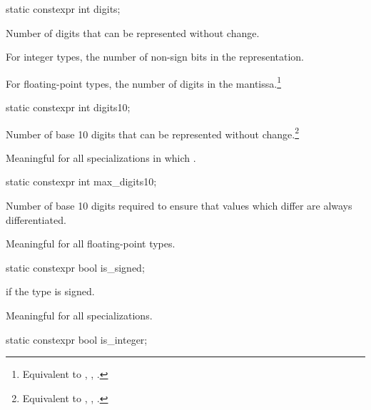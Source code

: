%
\begin{itemdecl}
static constexpr int digits;
\end{itemdecl}

\begin{itemdescr}
\pnum
Number of
digits that can be represented without change.

\pnum
For integer types, the number of non-sign bits in the representation.

\pnum For floating-point types, the number of  digits in the
mantissa.\footnote{Equivalent to , ,
.} \end{itemdescr}

%
\begin{itemdecl}
static constexpr int digits10;
\end{itemdecl}

\begin{itemdescr}
\pnum
Number of base 10 digits that can be represented without
change.\footnote{Equivalent to , ,
.}

\pnum
Meaningful for all specializations in which
.
\end{itemdescr}

%
\begin{itemdecl}
static constexpr int max_digits10;
\end{itemdecl}

\begin{itemdescr}
\pnum
Number of base 10 digits required to ensure that values which
differ are always differentiated.

\pnum
Meaningful for all floating-point types.
\end{itemdescr}

%
\begin{itemdecl}
static constexpr bool is_signed;
\end{itemdecl}

\begin{itemdescr}
\pnum
{} if the type is signed.

\pnum
Meaningful for all specializations.
\end{itemdescr}

%
\begin{itemdecl}
static constexpr bool is_integer;
\end{itemdecl}

